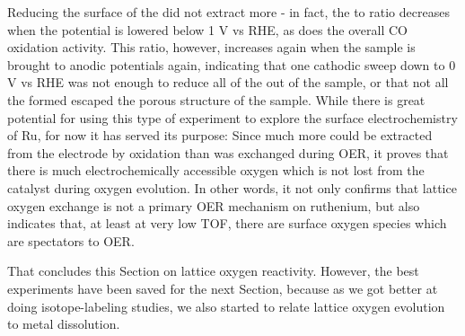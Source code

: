 Reducing the surface of the  did not extract more  - in fact, the  to  ratio decreases when the potential is lowered below 1 V vs RHE, as does the overall CO oxidation activity. This ratio, however, increases again when the sample is brought to anodic potentials again, indicating that one cathodic sweep down to 0 V vs RHE was not enough to reduce all of the  out of the sample, or that not all the  formed escaped the porous structure of the sample. While there is great potential for using this type of experiment to explore the surface electrochemistry of Ru, for now it has served its purpose: Since much more  could be extracted from the electrode by  oxidation than was exchanged during OER, it proves that there is much electrochemically accessible oxygen which is not lost from the catalyst during oxygen evolution. In other words, it not only confirms that lattice oxygen exchange is not a primary OER mechanism on ruthenium, but also indicates that, at least at very low TOF, there are surface oxygen species which are spectators to OER.

That concludes this Section on lattice oxygen reactivity. However, the best experiments have been saved for the next Section, because as we got better at doing isotope-labeling studies, we also started to relate lattice oxygen evolution to metal dissolution.




